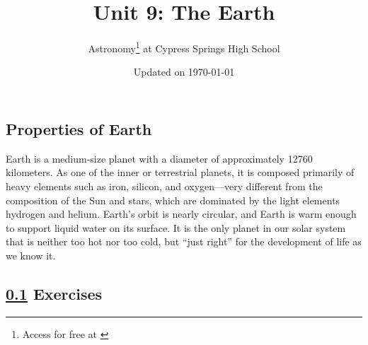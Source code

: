\documentclass{article}
\title{Unit 9: The Earth}
\author{Astronomy\footnote{Access for free at \href{\openstax}{\openstax}} \hspace{0.1ex} at Cypress Springs High School}
\date{Updated on \today}
\numberwithin{equation}{section}
\numberwithin{figure}{section}
\begin{document}
\maketitle

\subsection{Properties of Earth} \label{kdMLi7}

\begin{minipage}{0.55\textwidth}
    Earth is a medium-size planet with a diameter of approximately \SI{12760}{} kilometers. As one of the inner or terrestrial planets, it is composed primarily of heavy elements such as iron, silicon, and oxygen---very different from the composition of the Sun and stars, which are dominated by the light elements hydrogen and helium. Earth's orbit is nearly circular, and Earth is warm enough to support liquid water on its surface. It is the only planet in our solar system that is neither too hot nor too cold, but ``just right'' for the development of life as we know it.
\end{minipage}%
\hspace{5mm}
\begin{minipage}{0.35\textwidth}
\centering
\end{minipage}

\cyanhrule
\vspace{-1ex}


\subsection*{\ref{kdMLi7} Exercises}
\end{document}
